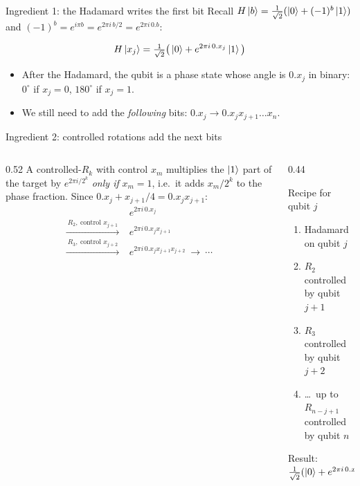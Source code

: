 \documentclass[aspectratio=169,11pt]{beamer}
\begin{document}
\begin{frame}{Ingredient 1: the Hadamard writes the first bit}
  Recall $H\ket{b} = \tfrac{1}{\sqrt2}(\ket0 + (-1)^b\ket1)$ and $(-1)^b = e^{i\pi b} = e^{2\pi i\,b/2} = e^{2\pi i\,0.b}$:
  \begin{block}{}
    \[ H\ket{x_j} = \tfrac{1}{\sqrt2}\big(\ket0 + e^{2\pi i\,0.x_j}\ket1\big) \]
  \end{block}
  \begin{itemize}
    \item After the Hadamard, the qubit is a phase state whose angle is $0.x_j$ in binary: $0^\circ$ if $x_j = 0$,
      $180^\circ$ if $x_j = 1$.
    \item We still need to add the \emph{following} bits: $0.x_j \to 0.x_jx_{j+1}\dots x_n$.
  \end{itemize}
\end{frame}

\begin{frame}{Ingredient 2: controlled rotations add the next bits}
  \begin{columns}[T]
    \begin{column}{0.52\textwidth}
      A controlled-$R_k$ with control $x_m$ multiplies the $\ket1$ part of the target by $e^{2\pi i/2^k}$ \emph{only if}
      $x_m = 1$, i.e.\ it adds $x_m/2^k$ to the phase fraction. Since $0.x_j + x_{j+1}/4 = 0.x_jx_{j+1}$:
      \[ \begin{aligned}
        & e^{2\pi i\,0.x_j}\\
        \xrightarrow{\ R_2,\ \text{control } x_{j+1}\ }\ & e^{2\pi i\,0.x_jx_{j+1}}\\
        \xrightarrow{\ R_3,\ \text{control } x_{j+2}\ }\ & e^{2\pi i\,0.x_jx_{j+1}x_{j+2}}\ \to\ \cdots
      \end{aligned} \]
    \end{column}
    \begin{column}{0.44\textwidth}
      \begin{block}{Recipe for qubit $j$}
        \begin{enumerate}
          \item Hadamard on qubit $j$
          \item $R_2$ controlled by qubit $j{+}1$
          \item $R_3$ controlled by qubit $j{+}2$
          \item \dots\ up to $R_{n-j+1}$ controlled by qubit $n$
        \end{enumerate}
        Result: $\tfrac{1}{\sqrt2}(\ket0 + e^{2\pi i\,0.x_j\dots x_n}\ket1)$
      \end{block}
    \end{column}
  \end{columns}
\end{frame}
\end{document}
